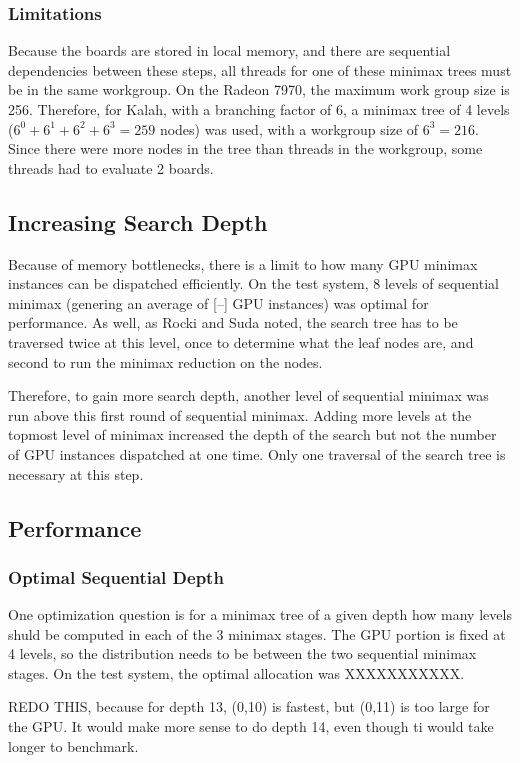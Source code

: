 \documentclass{article}
\begin{document}
\subsubsection{Limitations}
Because the boards are stored in local memory, and there are sequential dependencies between these steps, all threads for one of these minimax trees must be in the same workgroup. On the Radeon 7970, the maximum work group size is 256. Therefore, for Kalah, with a branching factor of 6, a minimax tree of 4 levels ($6^0 + 6^1 + 6^2 + 6^3 = 259$ nodes) was used, with a workgroup size of $6^3 = 216$. Since there were more nodes in the tree than threads in the workgroup, some threads had to evaluate 2 boards.

\subsection{Increasing Search Depth}
Because of memory bottlenecks, there is a limit to how many GPU minimax instances can be dispatched efficiently. On the test system, 8 levels of sequential minimax (genering an average of [--] GPU instances) was optimal for performance. As well, as Rocki and Suda\cite{rockisuda10} noted, the search tree has to be traversed twice at this level, once to determine what the leaf nodes are, and second to run the minimax reduction on the nodes.

Therefore, to gain more search depth, another level of sequential minimax was run above this first round of sequential minimax. Adding more levels at the topmost level of minimax increased the depth of the search but not the number of GPU instances dispatched at one time. Only one traversal of the search tree is necessary at this step.

\subsection{Performance}
\subsubsection{Optimal Sequential Depth}
One optimization question is for a minimax tree of a given depth how many levels shuld be computed in each of the 3 minimax stages. The GPU portion is fixed at 4 levels, so the distribution needs to be between the two sequential minimax stages. On the test system, the optimal allocation was XXXXXXXXXXX.

REDO THIS, because for depth 13, (0,10) is fastest, but (0,11) is too large for the GPU. It would make more sense to do depth 14, even though ti would take longer to benchmark.
\end{document}
